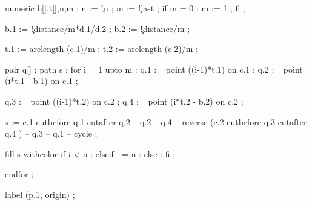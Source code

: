   numeric b[],t[],n,m ;
  n := \visualcounterparameter\c!n ;
  m := \visualcounterparameter\c!last ;
  if m = 0 : m := 1 ; fi ;

  b.1 := \visualcounterparameter\c!distance/m*d.1/d.2 ;
  b.2 := \visualcounterparameter\c!distance/m ;

  t.1 := arclength (c.1)/m ;
  t.2 := arclength (c.2)/m ;

  pair q[] ;
  path s ;
  for i = 1 upto m : 
    q.1 := point ((i-1)*t.1)        on c.1 ;
    q.2 := point (i*t.1 - b.1)  on c.1 ;

    q.3 := point ((i-1)*t.2)        on c.2 ;
    q.4 := point (i*t.2 - b.2)  on c.2 ;

    s := c.1 cutbefore q.1 cutafter q.2 -- q.2 -- q.4
       -- reverse (c.2 cutbefore q.3 cutafter q.4 ) -- q.3 -- q.1 
       -- cycle ;

    fill s withcolor 
      if i < n     :  
      elseif i = n : 
      else         : 
      fi ;

  endfor ;


  label (p.1, origin) ;


\stopuseMPgraphic

\protect
